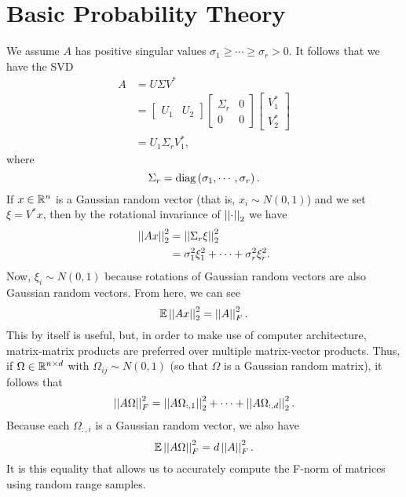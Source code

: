 \section{Basic Probability Theory}
\label{sec:rand_prob_theory_intro}

We assume $A$ has positive singular values
$\sigma_{1}\ge\cdots\ge\sigma_{r}>0$.
It follows that we have the SVD
%
\begin{align}
    A &= U\Sigma V^{*} \nonumber\\
    &= \begin{bmatrix} U_{1} & U_{2} \end{bmatrix}
        \begin{bmatrix} \Sigma_{r} & 0 \\ 0 & 0 \end{bmatrix}
        \begin{bmatrix} V_{1}^{*} \\ V_{2}^{*} \end{bmatrix} \nonumber\\
    &= U_{1}\Sigma_{r}V_{1}^{*},
\end{align}
%
where
%
\begin{equation}
    \Sigma_{r} = \operatorname{diag}\left( \sigma_{1},\cdots,\sigma_{r} \right).
\end{equation}
%
If $x\in\mathbb{R}^{n}$ is a Gaussian random vector (that is, $x_{i}\sim N(0,1)$)
and we set $\xi = V^{*}x$, then by the rotational invariance
of $\left| \left| \cdot \right| \right|_{2}$ we have
%
\begin{align}
    \left| \left| Ax \right| \right|_{2}^{2} &= \left| \left| \Sigma_{r}\xi \right| \right|_{2}^{2} \nonumber\\
        &= \sigma_{1}^{2}\xi_{1}^{2} + \cdots + \sigma_{r}^{2}\xi_{r}^{2}.
\end{align}
%
Now, $\xi_{i}\sim N(0,1)$ because rotations of Gaussian random vectors
are also Gaussian random vectors.
From here, we can see
%
\begin{equation}
    \mathbb{E}\left| \left| Ax \right| \right|_{2}^{2} = \left| \left| A \right| \right|_{F}^{2}.
\end{equation}
%
This by itself is useful, but, in order to make use of
computer architecture, matrix-matrix products are preferred over
multiple matrix-vector products.
Thus, if $\Omega\in\mathbb{R}^{n\times d}$ with $\Omega_{ij}\sim N(0,1)$
(so that $\Omega$ is a Gaussian random matrix), it follows that
%
\begin{equation}
    \left| \left| A\Omega \right| \right|_{F}^{2} = \left| \left| A\Omega_{:,1} \right| \right|_{2}^{2} + \cdots
        + \left| \left| A\Omega_{:,d} \right| \right|_{2}^{2}.
\end{equation}
%
Because each $\Omega_{:,i}$ is a Gaussian random vector, we also have
%
\begin{equation}
    \mathbb{E}\left| \left| A\Omega \right| \right|_{F}^{2} = d\left| \left| A \right| \right|_{F}^{2}.
    \label{eq:rand_new_error_bound}
\end{equation}
%
It is this equality that allows us to accurately compute the F-norm
of matrices using random range samples.


